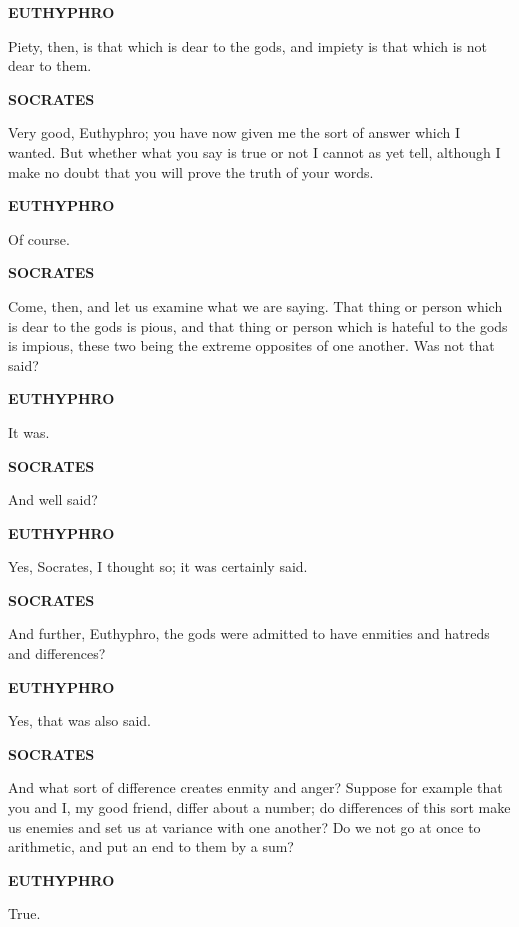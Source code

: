 \documentclass[11pt,letter]{article}
\begin{document}
\par \textbf{EUTHYPHRO}
\par   Piety, then, is that which is dear to the gods, and impiety is that which is not dear to them.

\par \textbf{SOCRATES}
\par   Very good, Euthyphro; you have now given me the sort of answer which I wanted. But whether what you say is true or not I cannot as yet tell, although I make no doubt that you will prove the truth of your words.

\par \textbf{EUTHYPHRO}
\par   Of course.

\par \textbf{SOCRATES}
\par   Come, then, and let us examine what we are saying. That thing or person which is dear to the gods is pious, and that thing or person which is hateful to the gods is impious, these two being the extreme opposites of one another. Was not that said?

\par \textbf{EUTHYPHRO}
\par   It was.

\par \textbf{SOCRATES}
\par   And well said?

\par \textbf{EUTHYPHRO}
\par   Yes, Socrates, I thought so; it was certainly said.

\par \textbf{SOCRATES}
\par   And further, Euthyphro, the gods were admitted to have enmities and hatreds and differences?

\par \textbf{EUTHYPHRO}
\par   Yes, that was also said.

\par \textbf{SOCRATES}
\par   And what sort of difference creates enmity and anger? Suppose for example that you and I, my good friend, differ about a number; do differences of this sort make us enemies and set us at variance with one another? Do we not go at once to arithmetic, and put an end to them by a sum?

\par \textbf{EUTHYPHRO}
\par   True.
\end{document}
